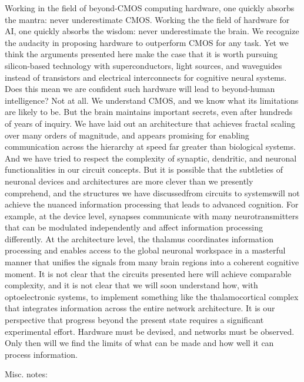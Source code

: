 \vspace{3em}
Working in the field of beyond-CMOS computing hardware, one quickly absorbs the mantra: never underestimate CMOS. Working the the field of hardware for AI, one quickly absorbs the wisdom: never underestimate the brain. We recognize the audacity in proposing hardware to outperform CMOS for any task. Yet we think the arguments presented here make the case that it is worth pursuing silicon-based technology with superconductors, light sources, and waveguides instead of transistors and electrical interconnects for cognitive neural systems. Does this mean we are confident such hardware will lead to beyond-human intelligence? Not at all. We understand CMOS, and we know what its limitations are likely to be. But the brain maintains important secrets, even after hundreds of years of inquiry. We have laid out an architecture that achieves fractal scaling over many orders of magnitude, and appears promising for enabling communication across the hierarchy at speed far greater than biological systems. And we have tried to respect the complexity of synaptic, dendritic, and neuronal functionalities in our circuit concepts. But it is possible that the subtleties of neuronal devices and architectures are more clever than we presently comprehend, and the structures we have discussed\textemdash from circuits to systems\textemdash will not achieve the nuanced information processing that leads to advanced cognition. For example, at the device level, synapses communicate with many neurotransmitters that can be modulated independently and affect information processing differently. At the architecture level, the thalamus coordinates information processing and enables access to the global neuronal workspace in a masterful manner that unifies the signals from many brain regions into a coherent cognitive moment. It is not clear that the circuits presented here will achieve comparable complexity, and it is not clear that we will soon understand how, with optoelectronic systems, to implement something like the thalamocortical complex that integrates information across the entire network architecture. It is our perspective that progress beyond the present state requires a significant experimental effort. Hardware must be devised, and networks must be observed. Only then will we find the limits of what can be made and how well it can process information.

\vspace{4em}
Misc. notes:

